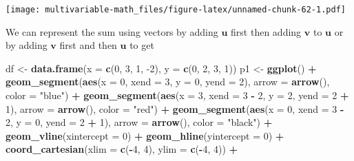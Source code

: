 \documentclass[
]{book}
\newenvironment{Shaded}{\begin{snugshade}}{\end{snugshade}}
\newcommand{\DataTypeTok}[1]{\textcolor[rgb]{0.13,0.29,0.53}{#1}}
\newcommand{\DecValTok}[1]{\textcolor[rgb]{0.00,0.00,0.81}{#1}}
\newcommand{\KeywordTok}[1]{\textcolor[rgb]{0.13,0.29,0.53}{\textbf{#1}}}
\newcommand{\NormalTok}[1]{#1}
\newcommand{\OperatorTok}[1]{\textcolor[rgb]{0.81,0.36,0.00}{\textbf{#1}}}
\newcommand{\StringTok}[1]{\textcolor[rgb]{0.31,0.60,0.02}{#1}}
\theoremstyle{definition}
\theoremstyle{definition}
\theoremstyle{definition}
\theoremstyle{definition}
\theoremstyle{remark}
\begin{document}
\texttt{[image: multivariable-math\_files/figure-latex/unnamed-chunk-62-1.pdf]}

We can represent the sum using vectors by adding \(\mathbf{u}\) first then adding \(\mathbf{v}\) to \(\mathbf{u}\) or by adding \(\mathbf{v}\) first and then \(\mathbf{u}\) to get

\begin{Shaded}
\begin{Highlighting}[]
\NormalTok{df <-}\StringTok{ }\KeywordTok{data.frame}\NormalTok{(}\DataTypeTok{x =} \KeywordTok{c}\NormalTok{(}\DecValTok{0}\NormalTok{, }\DecValTok{3}\NormalTok{, }\DecValTok{1}\NormalTok{, }\DecValTok{-2}\NormalTok{), }\DataTypeTok{y =} \KeywordTok{c}\NormalTok{(}\DecValTok{0}\NormalTok{, }\DecValTok{2}\NormalTok{, }\DecValTok{3}\NormalTok{, }\DecValTok{1}\NormalTok{))}
\NormalTok{p1 <-}\StringTok{ }\KeywordTok{ggplot}\NormalTok{() }\OperatorTok{+}
\StringTok{    }\KeywordTok{geom_segment}\NormalTok{(}\KeywordTok{aes}\NormalTok{(}\DataTypeTok{x =} \DecValTok{0}\NormalTok{, }\DataTypeTok{xend =} \DecValTok{3}\NormalTok{, }\DataTypeTok{y =} \DecValTok{0}\NormalTok{, }\DataTypeTok{yend =} \DecValTok{2}\NormalTok{), }\DataTypeTok{arrow =} \KeywordTok{arrow}\NormalTok{(), }\DataTypeTok{color =} \StringTok{"blue"}\NormalTok{) }\OperatorTok{+}
\StringTok{    }\KeywordTok{geom_segment}\NormalTok{(}\KeywordTok{aes}\NormalTok{(}\DataTypeTok{x =} \DecValTok{3}\NormalTok{, }\DataTypeTok{xend =} \DecValTok{3} \OperatorTok{-}\StringTok{ }\DecValTok{2}\NormalTok{, }\DataTypeTok{y =} \DecValTok{2}\NormalTok{, }\DataTypeTok{yend =} \DecValTok{2} \OperatorTok{+}\StringTok{ }\DecValTok{1}\NormalTok{), }\DataTypeTok{arrow =} \KeywordTok{arrow}\NormalTok{(), }\DataTypeTok{color =} \StringTok{"red"}\NormalTok{) }\OperatorTok{+}
\StringTok{    }\KeywordTok{geom_segment}\NormalTok{(}\KeywordTok{aes}\NormalTok{(}\DataTypeTok{x =} \DecValTok{0}\NormalTok{, }\DataTypeTok{xend =} \DecValTok{3} \OperatorTok{-}\StringTok{ }\DecValTok{2}\NormalTok{, }\DataTypeTok{y =} \DecValTok{0}\NormalTok{, }\DataTypeTok{yend =} \DecValTok{2} \OperatorTok{+}\StringTok{ }\DecValTok{1}\NormalTok{), }\DataTypeTok{arrow =} \KeywordTok{arrow}\NormalTok{(), }\DataTypeTok{color =} \StringTok{"black"}\NormalTok{) }\OperatorTok{+}
\StringTok{    }\KeywordTok{geom_vline}\NormalTok{(}\DataTypeTok{xintercept =} \DecValTok{0}\NormalTok{) }\OperatorTok{+}\StringTok{ }
\StringTok{    }\KeywordTok{geom_hline}\NormalTok{(}\DataTypeTok{yintercept =} \DecValTok{0}\NormalTok{) }\OperatorTok{+}
\StringTok{    }\KeywordTok{coord_cartesian}\NormalTok{(}\DataTypeTok{xlim =} \KeywordTok{c}\NormalTok{(}\OperatorTok{-}\DecValTok{4}\NormalTok{, }\DecValTok{4}\NormalTok{), }\DataTypeTok{ylim =} \KeywordTok{c}\NormalTok{(}\OperatorTok{-}\DecValTok{4}\NormalTok{, }\DecValTok{4}\NormalTok{)) }\OperatorTok{+}\StringTok{ }

\end{Highlighting}
\end{Shaded}
\end{document}
